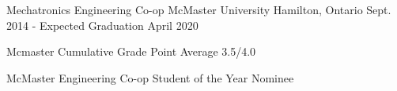
\begin{cventries}

  \cventry
    {Mechatronics Engineering Co-op} %
    {McMaster University} %
    {Hamilton, Ontario} %
    {Sept. 2014 - Expected Graduation April 2020} %
    {
      \begin{cvitems} %
        \item {Mcmaster Cumulative Grade Point Average 3.5/4.0}
        \item {McMaster Engineering Co-op Student of the Year Nominee}
      \end{cvitems}
    }


\end{cventries}
